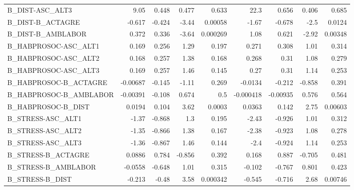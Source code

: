 \begin{tabular}{lrrrrrrrr}
B\_DIST-ASC\_ALT3               &        9.05 &        0.448 &   0.477 &    0.633 &       22.3 &       0.656 &        0.406 &         0.685 \\
B\_DIST-B\_ACTAGRE              &      -0.617 &       -0.424 &   -3.44 &  0.00058 &      -1.67 &      -0.678 &         -2.5 &        0.0124 \\
B\_DIST-B\_AMBLABOR             &       0.372 &        0.336 &   -3.64 & 0.000269 &       1.08 &       0.621 &        -2.92 &       0.00348 \\
B\_HABPROSOC-ASC\_ALT1          &       0.169 &        0.256 &    1.29 &    0.197 &      0.271 &       0.308 &         1.01 &         0.314 \\
B\_HABPROSOC-ASC\_ALT2          &       0.168 &        0.257 &    1.38 &    0.168 &      0.268 &        0.31 &         1.08 &         0.279 \\
B\_HABPROSOC-ASC\_ALT3          &       0.169 &        0.257 &    1.46 &    0.145 &       0.27 &        0.31 &         1.14 &         0.253 \\
B\_HABPROSOC-B\_ACTAGRE         &    -0.00687 &       -0.145 &   -1.11 &    0.269 &    -0.0134 &      -0.212 &       -0.858 &         0.391 \\
B\_HABPROSOC-B\_AMBLABOR        &    -0.00391 &       -0.108 &   0.674 &      0.5 &  -0.000418 &    -0.00935 &        0.576 &         0.564 \\
B\_HABPROSOC-B\_DIST            &      0.0194 &        0.104 &    3.62 &   0.0003 &     0.0363 &       0.142 &         2.75 &       0.00603 \\
B\_STRESS-ASC\_ALT1             &       -1.37 &       -0.868 &     1.3 &    0.195 &      -2.43 &      -0.926 &         1.01 &         0.312 \\
B\_STRESS-ASC\_ALT2             &       -1.35 &       -0.866 &    1.38 &    0.167 &      -2.38 &      -0.923 &         1.08 &         0.278 \\
B\_STRESS-ASC\_ALT3             &       -1.36 &       -0.867 &    1.46 &    0.144 &       -2.4 &      -0.924 &         1.14 &         0.253 \\
B\_STRESS-B\_ACTAGRE            &      0.0886 &        0.784 &  -0.856 &    0.392 &      0.168 &       0.887 &       -0.705 &         0.481 \\
B\_STRESS-B\_AMBLABOR           &     -0.0558 &       -0.648 &    1.01 &    0.315 &     -0.102 &      -0.767 &        0.801 &         0.423 \\
B\_STRESS-B\_DIST               &      -0.213 &        -0.48 &    3.58 & 0.000342 &     -0.545 &      -0.716 &         2.68 &       0.00746 \\

\end{tabular}
